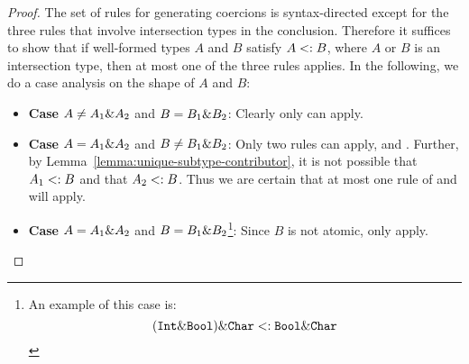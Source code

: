 \begin{proof}
The set of rules for generating coercions is syntax-directed except for the three rules that involve intersection types in the conclusion. Therefore it suffices to show that if well-formed types $A$ and $B$ satisfy $A <: B$, where $A$ or $B$ is an intersection type, then at most one of the three rules applies. In the following, we do a case analysis on the shape of $A$ and $B$:

\begin{itemize}
  \item \textbf{Case} $A \neq A_1 \& A_2$ and $B = B_1 \& B_2$: Clearly only  can apply.

  \item \textbf{Case} $A = A_1 \& A_2$ and $B \neq B_1 \& B_2$: Only two rules can apply,  and . Further, by Lemma~\ref{lemma:unique-subtype-contributor}, it is not possible that $A_1 <: B$ and that $A_2 <: B$. Thus we are certain that at most one rule of  and  will apply.

  \item \textbf{Case} $A = A_1 \& A_2$ and $B = B_1 \& B_2$\footnote{An example of this case is:
    \[ (\texttt{Int} \& \texttt{Bool}) \& \texttt{Char} <: \texttt{Bool} \& \texttt{Char} \]}: Since $B$ is not atomic, only  apply.

\end{itemize}
\end{proof}

